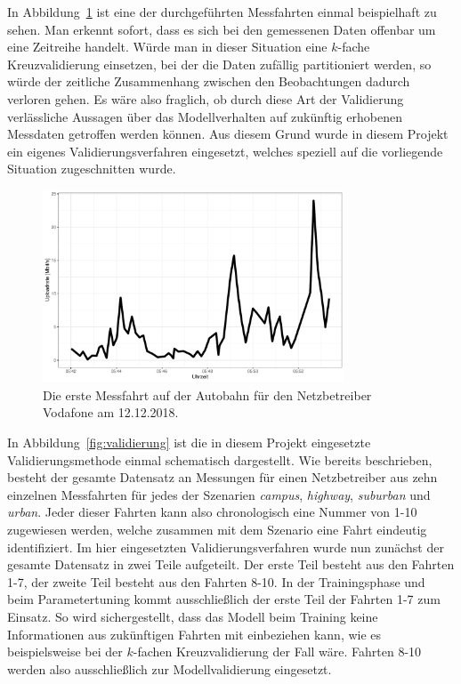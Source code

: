 In Abbildung~\ref{fig:messfahrt-vodafone} ist eine der durchgef\"uhrten Messfahrten einmal beispielhaft zu sehen.
Man erkennt sofort, dass es sich bei den gemessenen Daten offenbar um eine Zeitreihe handelt.
W\"urde man in dieser Situation eine $k$-fache Kreuzvalidierung einsetzen, bei der die Daten zuf\"allig partitioniert werden,
so w\"urde der zeitliche Zusammenhang zwischen den Beobachtungen dadurch verloren gehen.
Es w\"are also fraglich, ob durch diese Art der Validierung verl\"assliche Aussagen \"uber das Modellverhalten auf zuk\"unftig
erhobenen Messdaten getroffen werden k\"onnen.
Aus diesem Grund wurde in diesem Projekt ein eigenes Validierungsverfahren eingesetzt, welches speziell auf die vorliegende Situation
zugeschnitten wurde.

\begin{figure}
    \centering
    \includegraphics[width=0.8\textwidth]{abbildungen/highway_drive_vodafone}
    \caption{Die erste Messfahrt auf der Autobahn f\"ur den Netzbetreiber Vodafone am 12.12.2018.}
    \label{fig:messfahrt-vodafone}
\end{figure}

In Abbildung~\ref{fig:validierung} ist die in diesem Projekt eingesetzte Validierungsmethode einmal schematisch dargestellt.
Wie bereits beschrieben, besteht der gesamte Datensatz an Messungen f\"ur einen Netzbetreiber aus zehn einzelnen Messfahrten f\"ur
jedes der Szenarien \textit{campus}, \textit{highway}, \textit{suburban} und \textit{urban}.
Jeder dieser Fahrten kann also chronologisch eine Nummer von 1-10 zugewiesen werden, welche zusammen mit dem Szenario
eine Fahrt eindeutig identifiziert.
Im hier eingesetzten Validierungsverfahren wurde nun zun\"achst der gesamte Datensatz in zwei Teile aufgeteilt.
Der erste Teil besteht aus den Fahrten 1-7, der zweite Teil besteht aus den Fahrten 8-10.
In der Trainingsphase und beim Parametertuning kommt ausschlie{\ss}lich der erste Teil der Fahrten 1-7 zum Einsatz.
So wird sichergestellt, dass das Modell beim Training keine Informationen aus zuk\"unftigen Fahrten mit einbeziehen kann, wie
es beispielsweise bei der $k$-fachen Kreuzvalidierung der Fall w\"are. Fahrten 8-10 werden also ausschlie{\ss}lich zur Modellvalidierung
eingesetzt.

